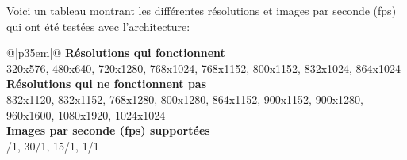\vspace{0.5\baselineskip}
\noindent Voici un tableau montrant les différentes résolutions et images par seconde (\acrshort{fps}) qui ont été testées avec l'architecture:
{
    \renewcommand*{\arraystretch}{1.4}
    \begin{table}[ht]
    \centering
    \caption{Résolutions et images par seconde (\acrshort{fps}) testés}\label{table:resolutions_tested}
    \vspace{0.1em} %
    \begin{tabular}{{@{}|p{35em}|@{}}}
         \hline
         \textbf{Résolutions qui fonctionnent}\\
         \hline
        320x576, 480x640, 720x1280, 768x1024, 768x1152, 800x1152, 832x1024, 864x1024\\
        \hline
        \textbf{Résolutions qui ne fonctionnent pas}\\
        \hline
        832x1120, 832x1152, 768x1280, 800x1280, 864x1152, 900x1152, 900x1280, 960x1600, 1080x1920, 1024x1024\\
        \hline
        \textbf{Images par seconde (\acrshort{fps}) supportées}\\
        /1, 30/1, 15/1, 1/1\\
        \hline
    \end{tabular}
    \end{table}
}
